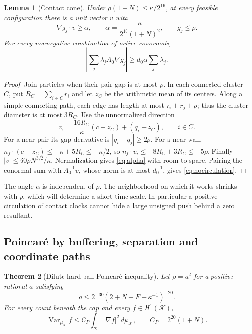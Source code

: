\documentclass[11pt]{article}
\numberwithin{equation}{section}
\newtheorem{theorem}{Theorem}[section]
\newtheorem{lemma}[theorem]{Lemma}
\theoremstyle{definition}
\theoremstyle{remark}\newtheorem{remark}[theorem]{Remark}
\newcommand{\Var}{\operatorname{Var}}
\newcommand{\K}{\mathcal K}
\newcommand{\dd}{\,d}
\begin{document}
\begin{lemma}[Contact cone]\label{lem:cone}
Under $\rho(1+N)\le\kappa/2^{16}$, at every feasible configuration there
is a unit vector $v$ with
\begin{equation}\label{eq:alpha}
 \nabla g_j\cdot v\ge\alpha,
 \qquad \alpha=\frac{\kappa}{2^{10}(1+N)^2},
 \qquad g_j\le\rho.
\end{equation}
For every nonnegative combination of active conormals,
\begin{equation}\label{eq:nocirculation}
 \left|\sum_j\lambda_jA_0\nabla g_j\right|
       \ge d_0\alpha\sum_j\lambda_j.
\end{equation}
\end{lemma}
\begin{proof}
Join particles when their pair gap is at most $\rho$. In each connected
cluster $C$, put $R_C=\sum_{i\in C}r_i$ and let $z_C$ be the arithmetic
mean of its centers. Along a simple connecting path, each edge has length
at most $r_i+r_j+\rho$; thus the cluster diameter is at most $3R_C$.
Use the unnormalized direction
\[
 v_i=\frac{16R_C}{\kappa}(c-z_C)+(q_i-z_C),\qquad i\in C.
\]
For a near pair its gap derivative is $|q_i-q_j|\ge2\rho$.
For a near wall,
$n_f\cdot(c-z_C)\le-\kappa+5R_C\le-\kappa/2$,
so $n_f\cdot v_i\le-8R_C+3R_C\le-5\rho$.
Finally $|v|\le60\rho N^{3/2}/\kappa$. Normalization gives
\eqref{eq:alpha} with room to spare. Pairing the conormal sum with
$A_0^{-1}v$, whose norm is at most $d_0^{-1}$, gives
\eqref{eq:nocirculation}.
\end{proof}

The angle $\alpha$ is independent of $\rho$. The neighborhood on which it
works shrinks with $\rho$, which will determine a short time scale. In
particular a positive circulation of contact clocks cannot hide a large
unsigned push behind a zero resultant.

\subsection{Poincar\'e by buffering, separation and coordinate paths}

\begin{theorem}[Dilute hard-ball Poincar\'e inequality]\label{thm:poincare}
Let $\rho=a^2$ for a positive rational $a$ satisfying
\begin{equation}\label{eq:atiny}
 a\le2^{-30}(2+N+F+\kappa^{-1})^{-20}.
\end{equation}
For every count beneath the cap and every $f\in H^1(\K)$,
\begin{equation}\label{eq:CP}
 \Var_{\mu_\K}f\le C_P\int_\K|\nabla f|^2\dd\mu_\K,
 \qquad C_P=2^{20}(1+N).
\end{equation}
\end{theorem}
\end{document}

